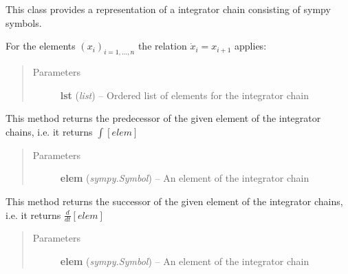 \documentclass[letterpaper,10pt,english]{sphinxmanual}
\begin{document}
\begin{fulllineitems}
\label{pytrajectory:pytrajectory.utilities.IntegChain}
This class provides a representation of a integrator chain consisting of sympy symbols.

For the elements \((x_i)_{i=1,...,n}\) the relation
\(\dot{x}_i = x_{i+1}\) applies:
\begin{quote}\begin{description}
\item[{Parameters}] \leavevmode
\textbf{lst} (\emph{list}) -- Ordered list of elements for the integrator chain

\end{description}\end{quote}

\begin{fulllineitems}
\label{pytrajectory:pytrajectory.utilities.IntegChain.pred}
This method returns the predecessor of the given element of the
integrator chains, i.e. it returns \(\int [elem]\)
\begin{quote}\begin{description}
\item[{Parameters}] \leavevmode
\textbf{elem} (\emph{sympy.Symbol}) -- An element of the integrator chain

\end{description}\end{quote}

\end{fulllineitems}


\begin{fulllineitems}
\label{pytrajectory:pytrajectory.utilities.IntegChain.succ}
This method returns the successor of the given element of the
integrator chains, i.e. it returns \(\frac{d}{dt}[elem]\)
\begin{quote}\begin{description}
\item[{Parameters}] \leavevmode
\textbf{elem} (\emph{sympy.Symbol}) -- An element of the integrator chain

\end{description}\end{quote}

\end{fulllineitems}


\end{fulllineitems}
\end{document}
